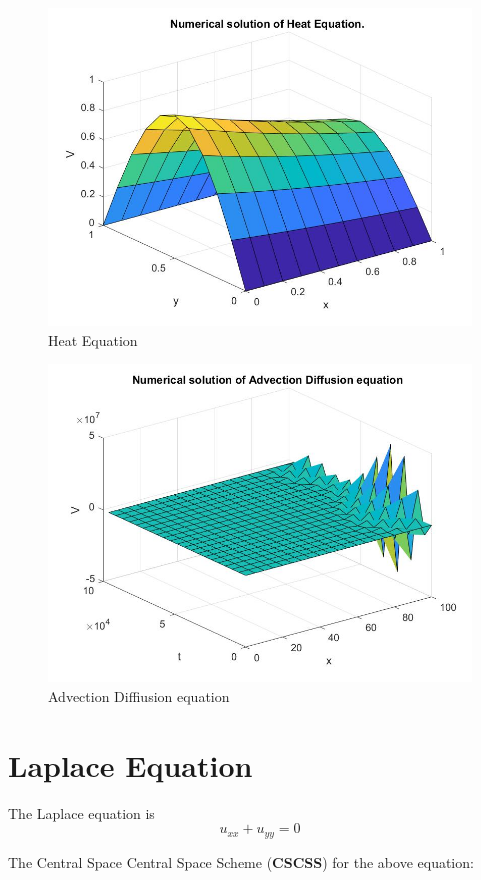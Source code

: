\begin{figure}
\centering
\includegraphics[scale=0.4]{heat.jpg}
\caption{Heat Equation}
\end{figure}
\begin{figure}
  \includegraphics[scale=0.4]{advection.jpg}
  \caption{Advection Diffiusion equation}
\end{figure}

\chapter{Laplace Equation}

The Laplace equation is
\[ u_{xx}+u_{yy}=0 \]

The Central Space Central Space Scheme (\textbf{CSCSS}) for the above equation:

